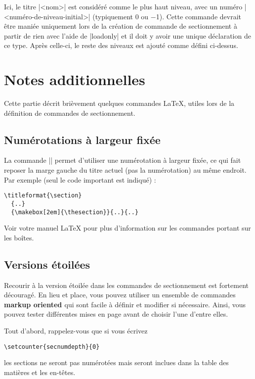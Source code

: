 \documentclass[a4paper]{ltxguide}
\newcommand{\trad}[1]{\textbf{\textcolor{orange5}{\noindent\ding{54} #1 \ding{54}}}}
\begin{document}
Ici, le titre |<nom>| est considéré comme le plus haut niveau, avec un
numéro |<numéro-de-niveau-initial>| (typiquement 0 ou $-$1). Cette commande devrait
être maniée uniquement lors de la création de commande de sectionnement à partir de
rien avec l'aide de |loadonly| et il doit y avoir une unique déclaration de ce type.
Après celle-ci, le reste des niveaux est ajouté comme défini ci-dessus.

\section{Notes additionnelles}

Cette partie décrit brièvement quelques commandes \LaTeX{}, utiles lors de la définition
de commandes de sectionnement.

\subsection{Numérotations à largeur fixée}

La commande |\makebox|  permet d'utiliser une numérotation à largeur fixée, ce qui
fait reposer la marge gauche du titre actuel (pas la numérotation) au même endroit.
Par exemple (seul le code important est indiqué) :
\begin{verbatim}
\titleformat{\section}
  {..}
  {\makebox[2em]{\thesection}}{..}{..}
\end{verbatim}

Voir votre manuel \LaTeX{} pour plus d'information sur les commandes portant sur les boîtes.

\subsection{Versions étoilées} \label{s:starred}


Recourir à la version étoilée dans les commandes de sectionnement est fortement
découragé. En lieu et place, vous pouvez utiliser un ensemble de commandes \trad{markup
oriented} qui sont facile à définir et modifier si nécessaire. Ainsi, vous pouvez tester
différentes mises en page avant de choisir l'une d'entre elles.

Tout d'abord, rappelez-vous que si vous écrivez
\begin{verbatim}
\setcounter{secnumdepth}{0}
\end{verbatim}
les sections ne seront pas numérotées mais seront inclues dans la table des matières
et les en-têtes.
\end{document}
